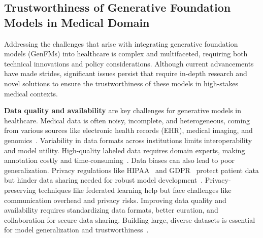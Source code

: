 \subsection{Trustworthiness of Generative Foundation Models in Medical Domain}

Addressing the challenges that arise with integrating generative foundation models (GenFMs) into healthcare is complex and multifaceted, requiring both technical innovations and policy considerations. Although current advancements have made strides, significant issues persist that require in-depth research and novel solutions to ensure the trustworthiness of these models in high-stakes medical contexts.

\textbf{Data quality and availability} are key challenges for generative models in healthcare. Medical data is often noisy, incomplete, and heterogeneous, coming from various sources like electronic health records (EHR), medical imaging, and genomics~\cite{johnson2016mimic}. Variability in data formats across institutions limits interoperability and model utility. High-quality labeled data requires domain experts, making annotation costly and time-consuming~\cite{kohli2017medical}. Data biases can also lead to poor generalization. Privacy regulations like HIPAA~\cite{gostin2009beyond} and GDPR~\cite{li2019impact} protect patient data but hinder data sharing needed for robust model development~\cite{shickel2017deep}. Privacy-preserving techniques like federated learning help but face challenges like communication overhead and privacy risks. Improving data quality and availability requires standardizing data formats, better curation, and collaboration for secure data sharing. Building large, diverse datasets is essential for model generalization and trustworthiness~\cite{yang2019federated}.

